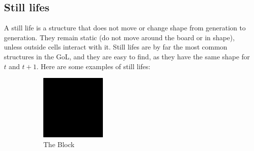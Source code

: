 \documentclass{l4proj}
\begin{document}
\subsection{Still lifes}

A still life is a structure that does not move or change shape from generation to generation. They remain static (do not move around the board or in shape), unless outside cells interact with it. Still lifes are by far the most common structures in the GoL, and they are easy to find, as they have the same shape for $t$ and $t+1$. Here are some examples of still lifes:

\begin{figure}[h]
\centering
\begin{subfigure}[b]{0.2\textwidth}
    \includegraphics[width=\textwidth]{dissertation/images/gol_structures/still_life_1.png} 
    \caption{The Block} %
    \label{fig:subim1}
\end{subfigure}
\hfill
\begin{subfigure}[b]{0.2\textwidth}

\end{subfigure}
\end{figure}
\end{document}
